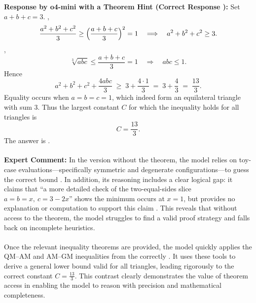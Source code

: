 \begin{examplebox}


\textbf{Response by o4-mini with a Theorem Hint (Correct Response \cmark):}
Set \(a+b+c=3\).  ,
\[
\frac{a^2+b^2+c^2}{3}\ge\Bigl(\frac{a+b+c}{3}\Bigr)^2=1
\quad\Longrightarrow\quad
a^2+b^2+c^2\ge3.
\]
,
\[
\sqrt[3]{abc}\le\frac{a+b+c}{3}=1
\quad\Longrightarrow\quad
abc\le1.
\]
Hence
\[
a^2+b^2+c^2+\frac{4abc}{3}
\;\ge\;3+\frac{4\cdot1}{3}
\;=\;3+\frac43
\;=\;\frac{13}{3}.
\]
Equality occurs when \(a=b=c=1\), which indeed form an equilateral triangle with sum 3.  Thus the largest constant \(C\) for which the inequality holds for all triangles is
\[
C=\frac{13}{3}.
\]
The answer is .
\\\\
\textbf{Expert Comment:} 
In the version without the theorem, the model relies on toy-case evaluations—specifically symmetric and degenerate configurations—to guess the correct bound \wronghl. In addition, its reasoning includes a clear logical gap: it claims that “a more detailed check of the two-equal-sides slice $a = b = x,\ c = 3 - 2x$” shows the minimum occurs at $x = 1$, but provides no explanation or computation to support this claim \wronghl. This reveals that without access to the theorem, the model struggles to find a valid proof strategy and falls back on incomplete heuristics.
\\\\
Once the relevant inequality theorems are provided, the model quickly applies the QM–AM and AM–GM inequalities from the  correctly \correcthl. It uses these tools to derive a general lower bound valid for all triangles, leading rigorously to the correct constant $C = \frac{13}{3}$. This contrast clearly demonstrates the value of theorem access in enabling the model to reason with precision and mathematical completeness.

\end{examplebox}